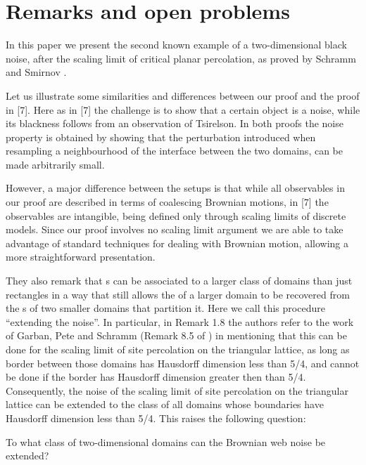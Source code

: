 {
\section{Remarks and open problems}

\label{sec:open-problems}

In this paper we present the second known example of a two-dimensional
black noise, after the scaling limit of critical planar percolation,
as proved by Schramm and Smirnov \cite{schramm-smirnov}.

Let us illustrate some similarities and differences between our proof
and the proof in [7]. Here as in [7] the challenge is to show that a
certain object is a noise, while its blackness follows from an
observation of Tsirelson. In both proofs the noise property is
obtained by showing that the perturbation introduced when resampling a
neighbourhood of the interface between the two domains, can be made
arbitrarily small.

However, a major difference between the setups is that while all
observables in our proof are described in terms of coalescing Brownian
motions, in [7] the observables are intangible, being defined only
through scaling limits of discrete models. Since our proof involves no
scaling limit argument we are able to take advantage of standard
techniques for dealing with Brownian motion, allowing a more
straightforward presentation.


They also remark
that \sigfield{}s can be associated to a larger class of domains than
just rectangles in a way that still allows the \sigfield{} of a larger
domain to be recovered from the \sigfield{}s of two smaller domains
that partition it.
Here we call this procedure ``extending the noise''.
In particular, in Remark 1.8 the authors refer to the work of Garban,
Pete and Schramm (Remark 8.5 of \cite{garban-pete-schramm}) in
mentioning that this can be done for the
scaling limit of site percolation on the triangular lattice, as long
as border between those domains has Hausdorff dimension less
than 5/4, and cannot be done if the border has Hausdorff dimension
greater then than 5/4.
Consequently, the noise of the scaling limit of site percolation on
the triangular lattice can be extended to the class of all domains
whose boundaries have Hausdorff dimension less than 5/4.
This raises the following question:

\begin{openproblem}
  \label{openproblem:extend}
  To what class of two-dimensional domains can the Brownian web noise be extended?
\end{openproblem}

}
